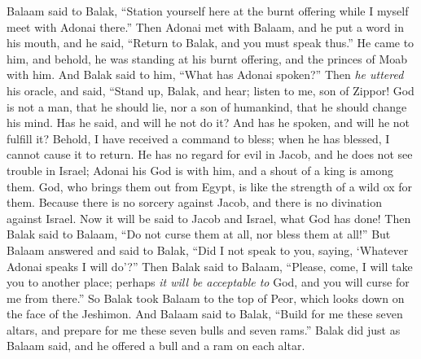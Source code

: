 \begin{biblechapter}
\verse Balaam said to Balak, “Station yourself here at the burnt offering while I myself meet with Adonai there.”
\verse Then Adonai met with Balaam, and he put a word in his mouth, and he said, “Return to Balak, and you must speak thus.”
\verse He came to him, and behold, he was standing at his burnt offering, and the princes of Moab with him. And Balak said to him, “What has Adonai spoken?”
\verse Then \textit{he uttered} his oracle, and said,
\verse “Stand up, Balak, and hear; 
listen to me, son of Zippor!
\verse God is not a man, that he should lie, 
nor a son of humankind, 
that he should change his mind. 
Has he said, and will he not do it? 
And has he spoken, and will he not fulfill it?
\verse Behold, I have received a command to bless; 
when he has blessed, I cannot cause it to return.
\verse He has no regard for evil in Jacob, 
and he does not see trouble in Israel; 
Adonai his God is with him, 
and a shout of a king is among them.
\verse God, who brings them out from Egypt, 
is like the strength of a wild ox for them.
\verse Because there is no sorcery against Jacob, 
and there is no divination against Israel. 
Now it will be said to Jacob and Israel, 
what God has done!
\verse Then Balak said to Balaam, “Do not curse them at all, nor bless them at all!”
\verse But Balaam answered and said to Balak, “Did I not speak to you, saying, ‘Whatever Adonai speaks I will do’?”
\verse Then Balak said to Balaam, “Please, come, I will take you to another place; perhaps \textit{it will be acceptable to} God, and you will curse for me from there.”
\verse So Balak took Balaam to the top of Peor, which looks down on the face of the Jeshimon.
\verse And Balaam said to Balak, “Build for me these seven altars, and prepare for me these seven bulls and seven rams.”
\verse Balak did just as Balaam said, and he offered a bull and a ram on each altar.
\end{biblechapter}

